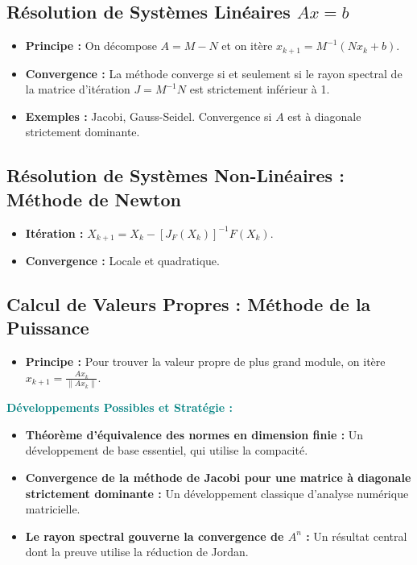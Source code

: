 \documentclass[12pt, a4paper, parskip=full]{report}
\theoremstyle{agregstyle}
\newenvironment{developpements}
  {\par\medskip\noindent\begin{oframed}\noindent\textbf{\textcolor{teal}{Développements Possibles et Stratégie :}}}
  {\end{oframed}\par\medskip}
\begin{document}
\subsection{Résolution de Systèmes Linéaires $Ax=b$}
\begin{itemize}
    \item \textbf{Principe :} On décompose $A=M-N$ et on itère $x_{k+1} = M^{-1}(Nx_k + b)$.
    \item \textbf{Convergence :} La méthode converge si et seulement si le rayon spectral de la matrice d'itération $J=M^{-1}N$ est strictement inférieur à 1.
    \item \textbf{Exemples :} Jacobi, Gauss-Seidel. Convergence si $A$ est à diagonale strictement dominante.
\end{itemize}
\subsection{Résolution de Systèmes Non-Linéaires : Méthode de Newton}
\begin{itemize}
    \item \textbf{Itération :} $X_{k+1} = X_k - [J_F(X_k)]^{-1} F(X_k)$.
    \item \textbf{Convergence :} Locale et quadratique.
\end{itemize}
\subsection{Calcul de Valeurs Propres : Méthode de la Puissance}
\begin{itemize}
    \item \textbf{Principe :} Pour trouver la valeur propre de plus grand module, on itère $x_{k+1} = \frac{A x_k}{\|A x_k\|}$.
\end{itemize}

\begin{developpements}
    \begin{itemize}
        \item \textbf{Théorème d'équivalence des normes en dimension finie :} Un développement de base essentiel, qui utilise la compacité.
        \item \textbf{Convergence de la méthode de Jacobi pour une matrice à diagonale strictement dominante :} Un développement classique d'analyse numérique matricielle.
        \item \textbf{Le rayon spectral gouverne la convergence de $A^n$ :} Un résultat central dont la preuve utilise la réduction de Jordan.
    \end{itemize}
\end{developpements}
\end{document}
